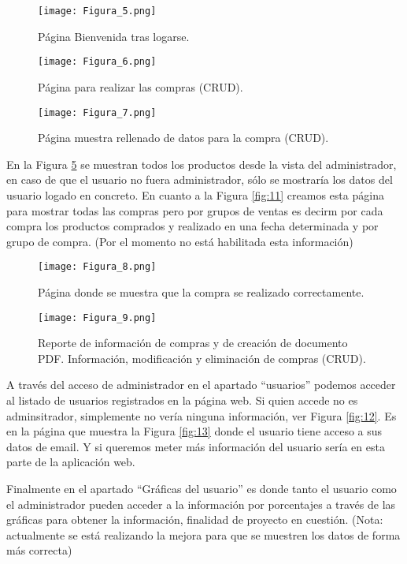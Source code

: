 \documentclass{article}
\begin{document}
\begin{figure}[h]
\centering
\texttt{[image: Figura\_5.png]}
\caption{\label{fig:6}Página Bienvenida tras logarse.}
\end{figure}

\begin{figure}[h]
\centering
\texttt{[image: Figura\_6.png]}
\caption{\label{fig:7}Página para realizar las compras (CRUD).}
\end{figure}

\begin{figure}[h]
\centering
\texttt{[image: Figura\_7.png]}
\caption{\label{fig:8}Página muestra rellenado de datos para la compra (CRUD).}
\end{figure}

En la Figura \ref{fig:10} se muestran todos los productos desde la vista del administrador, en caso de que el usuario no fuera administrador, sólo se mostraría los datos del usuario logado en concreto.
En cuanto a la Figura \ref{fig:11} creamos esta página para mostrar todas las compras pero por grupos de ventas es decirm por cada compra los productos comprados y realizado en una fecha determinada y por grupo de compra. (Por el momento no está habilitada esta información)
\begin{figure}[h]
\centering
\texttt{[image: Figura\_8.png]}
\caption{\label{fig:9}Página donde se muestra que la compra se realizado correctamente.}
\end{figure}

\begin{figure}[h]
\centering
\texttt{[image: Figura\_9.png]}
\caption{\label{fig:10}Reporte de información de compras y de creación de documento PDF. Información, modificación y eliminación de compras (CRUD).}
\end{figure}

A través del acceso de administrador en el apartado ``usuarios'' podemos acceder al listado de usuarios registrados en la página web. Si quien accede no es adminsitrador, simplemente no vería ninguna información, ver Figura \ref{fig:12}. Es en la página que muestra la Figura \ref{fig:13} donde el usuario tiene acceso a sus datos de email. Y si queremos meter más información del usuario sería en esta parte de la aplicación web.

Finalmente en el apartado ``Gráficas del usuario'' es donde tanto el usuario como el administrador pueden acceder a la información por porcentajes a través de las gráficas para obtener la información, finalidad de proyecto en cuestión. (Nota: actualmente se está realizando la mejora para que se muestren los datos de forma más correcta)
\end{document}
